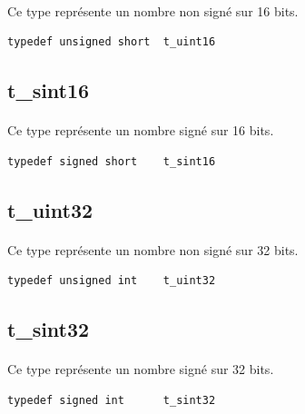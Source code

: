 \documentclass[10pt,a4wide]{article}
\begin{document}
\paragraph{}

Ce type repr\'esente un nombre non sign\'e sur 16 bits.

\begin{verbatim}
typedef unsigned short  t_uint16
\end{verbatim}

\subsection{t\_sint16}

\paragraph{}

Ce type repr\'esente un nombre sign\'e sur 16 bits.

\begin{verbatim}
typedef signed short    t_sint16
\end{verbatim}

\subsection{t\_uint32}

\paragraph{}

Ce type repr\'esente un nombre non sign\'e sur 32 bits.

\begin{verbatim}
typedef unsigned int    t_uint32
\end{verbatim}

\subsection{t\_sint32}

\paragraph{}

Ce type repr\'esente un nombre sign\'e sur 32 bits.

\begin{verbatim}
typedef signed int      t_sint32
\end{verbatim}
\end{document}
